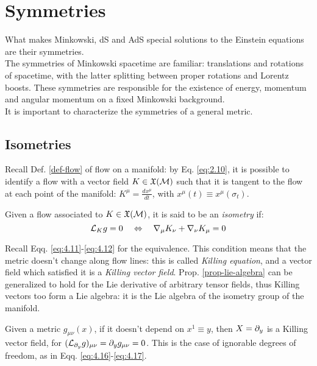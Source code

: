 \section{Symmetries}

What makes Minkowski, dS and AdS special solutions to the Einstein equations are their symmetries.\\
The symmetries of Minkowski spacetime are familiar: translations and rotations of spacetime, with the latter splitting between proper rotations and Lorentz boosts. These symmetries are responsible for the existence of energy, momentum and angular momentum on a fixed Minkowski background.\\
It is important to characterize the symmetries of a general metric.

\subsection{Isometries}

Recall Def. \ref{def-flow} of flow on a manifold: by Eq. \ref{eq:2.10}, it is possible to identify a flow with a vector field $ K \in \mathfrak{X}(\mathcal{M}) $ such that it is tangent to the flow at each point of the manifold: $ K^\mu = \frac{dx^\mu}{dt} $, with $ x^\mu(t) \equiv x^\mu(\sigma_t) $.

\begin{definition}
  Given a flow associated to $ K \in \mathfrak{X}(\mathcal{M}) $, it is said to be an \textit{isometry} if:
  \begin{equation}
    \mathcal{L}_K g = 0
    \quad \Leftrightarrow \quad
    \nabla_\mu K_\nu + \nabla_\nu K_\mu = 0
    \label{eq:4.28}
  \end{equation}
\end{definition}
Recall Eqq. \ref{eq:4.11}-\ref{eq:4.12} for the equivalence. This condition means that the metric doesn't change along flow lines: this is called \textit{Killing equation}, and a vector field which satisfied it is a \textit{Killing vector field}.
Prop. \ref{prop-lie-algebra} can be generalized to hold for the Lie derivative of arbitrary tensor fields, thus Killing vectors too form a Lie algebra: it is the Lie algebra of the isometry group of the manifold.

\begin{example}
  Given a metric $ g_{\mu \nu}(x) $, if it doesn't depend on $ x^1 \equiv y $, then $ X = \partial_y $ is a Killing vector field, for $ (\mathcal{L}_{\partial_y} g)_{\mu \nu} = \partial_y g_{\mu \nu} = 0 $. This is the case of ignorable degrees of freedom, as in Eqq. \ref{eq:4.16}-\ref{eq:4.17}.
\end{example}

